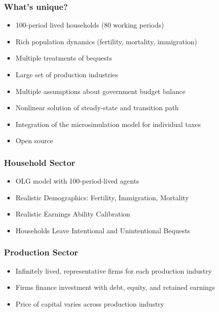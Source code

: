 \documentclass{beamer}
\begin{document}
  \begin{frame}
    \frametitle{What's unique?}
    \begin{itemize}
      \item 100-period lived households (80 working periods)
      \vspace{2mm}
      \item Rich population dynamics (fertility, mortality, immigration)
      \vspace{2mm}
      \item Multiple treatments of bequests
      \vspace{2mm}
      \item Large set of production industries
      \vspace{2mm}
      \item Multiple assumptions about government budget balance
      \vspace{2mm}
      \item Nonlinear solution of steady-state and transition path
      \vspace{2mm}
      \item Integration of the microsimulation model for individual taxes
      \vspace{2mm}
      \item Open source
    \end{itemize}
  \end{frame}

    \begin{frame}
    \frametitle{Household Sector}
    \begin{itemize}
      \item OLG model with 100-period-lived agents
      \item Realistic Demographics: Fertility, Immigration, Mortality
      \item Realistic Earnings Ability Calibration
      \item Households Leave Intentional and Unintentional Bequests
    \end{itemize}
  \end{frame}


      \begin{frame}
    \frametitle{Production Sector}
    \begin{itemize}
      \item Infinitely lived, representative firms for each production industry
      \item Firms finance investment with debt, equity, and retained earnings
      \item Price of capital varies across production industry
    \end{itemize}
  \end{frame}
\end{document}
